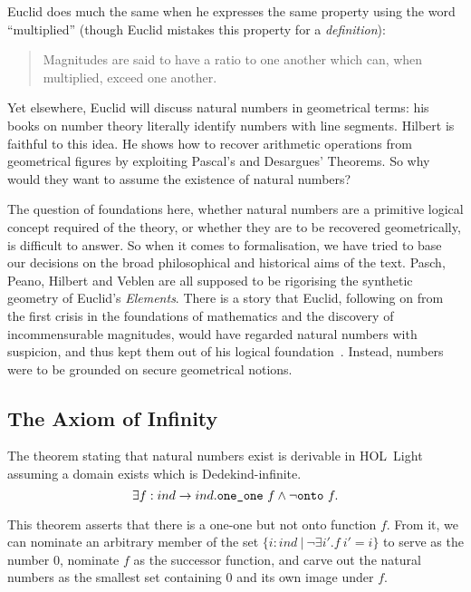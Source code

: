 Euclid does much the same when he expresses the same property using the word ``multiplied'' (though Euclid mistakes this property for a \emph{definition}):
\begin{quote}
  Magnitudes are said to have a ratio to one another which can, when multiplied, exceed one another.\cite{Aleph0Elements}
\end{quote}

Yet elsewhere, Euclid will discuss natural numbers in geometrical terms: his books on number theory literally identify numbers with line segments. Hilbert is faithful to this idea. He shows how to recover arithmetic operations from geometrical figures by exploiting Pascal's and Desargues' Theorems. So why would they want to assume the existence of natural numbers?

The question of foundations here, whether natural numbers are a primitive logical concept required of the theory, or whether they are to be recovered geometrically, is difficult to answer. So when it comes to formalisation, we have tried to base our decisions on the broad philosophical and historical aims of the text. Pasch, Peano, Hilbert and Veblen are all supposed to be rigorising the synthetic geometry of Euclid's \emph{Elements}. There is a story that Euclid, following on from the first crisis in the foundations of mathematics and the discovery of incommensurable magnitudes, would have regarded natural numbers with suspicion, and thus kept them out of his logical foundation~\cite{EvolutionEuclideanElements}. Instead, numbers were to be grounded on secure geometrical notions.

\subsection{The Axiom of Infinity}
The theorem stating that natural numbers exist is derivable in HOL~Light assuming a domain exists which is Dedekind-infinite.
\begin{equation}\label{eq:InfinityAxiom}
  \exists f : ind\rightarrow ind. \texttt{one\_one}\ f \wedge \neg\texttt{onto}\ f.
\end{equation}

This theorem asserts that there is a one-one but not onto function $f$. From it, we can nominate an arbitrary member of the set $\{ i : ind\ \vert\ \neg\exists i'. f\ i' = i \}$ to serve as the number $0$, nominate $f$ as the successor function, and carve out the natural numbers as the smallest set containing $0$ and its own image under $f$.


